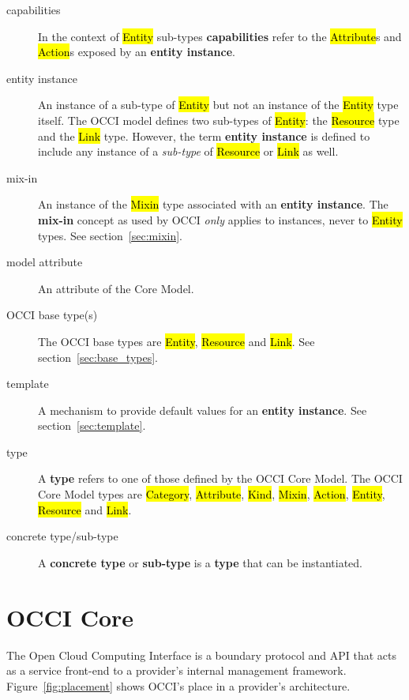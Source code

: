 \documentclass[10pt,a4paper]{article}
\begin{document}
\begin{description}
  \item[capabilities] In the context of \hl{Entity} sub-types
    {\bf  capabilities} refer to the \hl{Attribute}s and \hl{Action}s
    exposed by an {\bf entity instance}.

  \item[entity instance] An instance of a sub-type of
    \hl{Entity} but not an instance of the \hl{Entity} type itself.
    The OCCI model defines two sub-types of \hl{Entity}:
    the \hl{Resource} type and the \hl{Link} type.  However, the term
    {\bf entity instance} is defined to include any instance of a
    {\em sub-type} of \hl{Resource} or \hl{Link} as well.

  \item[mix-in] An instance of the \hl{Mixin} type associated with an
    {\bf entity instance}. The \textbf{mix-in} concept as used by OCCI
    {\em only} applies to instances, never to \hl{Entity} types.
    See section~\ref{sec:mixin}.

  \item[model attribute] An attribute of the Core Model.

  \item[OCCI base type(s)] The OCCI base types are \hl{Entity},
    \hl{Resource} and \hl{Link}.
    See section~\ref{sec:base_types}.

  \item[template] A mechanism to provide default values for an {\bf entity
    instance}. See section~\ref{sec:template}.

  \item[type] A {\bf type} refers to one of those defined by the OCCI
    Core Model.  The OCCI Core Model types are \hl{Category},
    \hl{Attribute},
    \hl{Kind}, \hl{Mixin}, \hl{Action}, \hl{Entity}, \hl{Resource} and
    \hl{Link}.

  \item[concrete type/sub-type] A \textbf{concrete type} or \textbf{sub-type} is a \textbf{type} that can
    be instantiated.
\end{description}

\section{OCCI Core}
The Open Cloud Computing Interface is a boundary protocol and API that
acts as a service front-end to a provider's internal management
framework. Figure~\ref{fig:placement} shows OCCI's place in a
provider's architecture.
\end{document}
